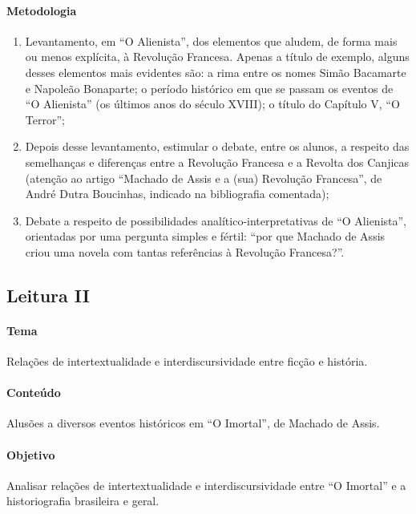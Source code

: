 \documentclass{extarticle}
\begin{document}
\paragraph{Metodologia}
\begin{enumerate}
\item Levantamento, em ``O Alienista'', dos elementos que aludem, de forma
mais ou menos explícita, à Revolução Francesa. Apenas a título de
exemplo, alguns desses elementos mais evidentes são: a rima entre os
nomes Simão Bacamarte e Napoleão Bonaparte; o período histórico em que
se passam os eventos de ``O Alienista'' (os últimos anos do século
XVIII); o título do Capítulo V, ``O Terror'';

\item Depois desse levantamento, estimular o debate, entre os alunos, a
respeito das semelhanças e diferenças entre a Revolução Francesa e a
Revolta dos Canjicas (atenção ao artigo ``Machado de Assis e a (sua)
Revolução Francesa'', de André Dutra Boucinhas, indicado na bibliografia
comentada);

\item Debate a respeito de possibilidades analítico-interpretativas de ``O
Alienista'', orientadas por uma pergunta simples e fértil: ``por que
Machado de Assis criou uma novela com tantas referências à Revolução
Francesa?''.
\end{enumerate}

\subsection{Leitura II}


\paragraph{Tema} Relações de intertextualidade e interdiscursividade entre
ficção e história.

\paragraph{Conteúdo} Alusões a diversos eventos históricos em ``O
Imortal'', de Machado de Assis.

\paragraph{Objetivo} Analisar relações de intertextualidade e
interdiscursividade entre ``O Imortal'' e a historiografia brasileira e
geral.
\end{document}
